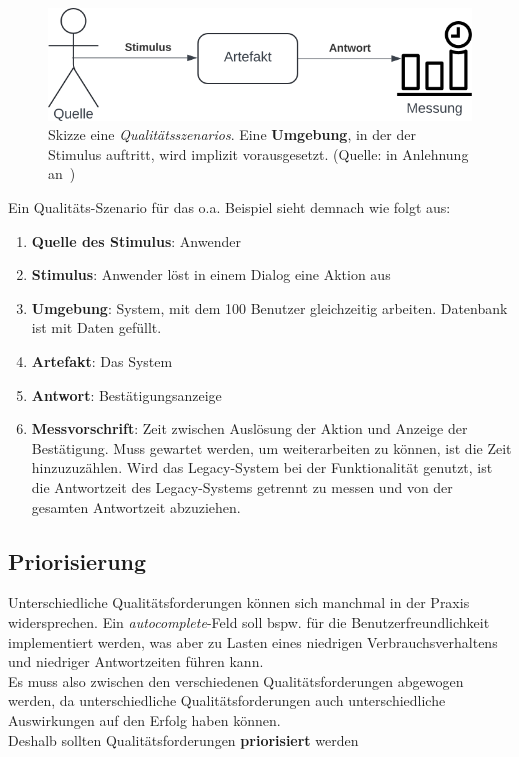 \begin{figure}
    \centering
    \includegraphics[scale=0.4]{part four/Qualität/img/qualitätsszenario}
    \caption{Skizze eine \textit{Qualitätsszenarios}. Eine \textbf{Umgebung}, in der der Stimulus auftritt, wird implizit vorausgesetzt. (Quelle: in Anlehnung an~\cite[Abb. 1.2, 4]{Wed09c})}
    \label{fig:qualitätsszenario}
\end{figure}


\noindent
Ein Qualitäts-Szenario für das o.a. Beispiel sieht demnach wie folgt aus:

\begin{enumerate}
    \item \textbf{Quelle des Stimulus}: Anwender
    \item \textbf{Stimulus}: Anwender löst in einem Dialog eine Aktion aus
    \item \textbf{Umgebung}: System, mit dem 100 Benutzer gleichzeitig arbeiten. Datenbank ist mit Daten gefüllt.
    \item \textbf{Artefakt}: Das System
    \item \textbf{Antwort}: Bestätigungsanzeige
    \item \textbf{Messvorschrift}: Zeit zwischen Auslösung der Aktion und Anzeige der Bestätigung. Muss gewartet werden, um weiterarbeiten zu können, ist die Zeit hinzuzuzählen. Wird das Legacy-System bei der Funktionalität genutzt, ist die Antwortzeit des Legacy-Systems getrennt zu messen und von der gesamten Antwortzeit abzuziehen.
\end{enumerate}

\subsection*{Priorisierung}
Unterschiedliche Qualitätsforderungen können sich manchmal in der Praxis widersprechen. Ein \textit{autocomplete}-Feld soll bspw. für die Benutzerfreundlichkeit implementiert werden, was aber zu Lasten eines niedrigen Verbrauchsverhaltens und niedriger Antwortzeiten führen kann.\\
Es muss also zwischen den verschiedenen Qualitätsforderungen abgewogen werden, da unterschiedliche Qualitätsforderungen auch unterschiedliche Auswirkungen auf den Erfolg haben können.\\
Deshalb sollten Qualitätsforderungen \textbf{priorisiert} werden

